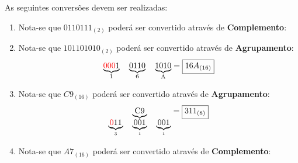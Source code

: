 \documentclass{article}
\begin{document}
            \begin{resolution}
                As seguintes conversões devem ser realizadas:
                \begin{enumerate}[rightmargin = \leftmargin]
                    \item Nota-se que $0110111_{(2)}$ poderá ser convertido através de \textbf{Complemento}:
                        \begin{figure}[H]
                            \centering
                        \end{figure}

                    \item Nota-se que $101101010_{(2)}$ poderá ser convertido através de \textbf{Agrupamento}:
                        \begin{equation*}
                            \underbrace{\text{\textcolor{red}{000}1}}_{
                                \text{1}
                            }
                            \quad
                            \underbrace{\text{0110}}_{
                                \text{6}
                            }
                            \quad
                            \underbrace{\text{1010}}_{
                                \text{A}
                            } = 
                            \boxed{16A_{(16)}}
                        \end{equation*}

                    \item Nota-se que $C9_{(16)}$ poderá ser convertido através de \textbf{Agrupamento}:
                        \begin{equation*}
                            \underbrace{\text{C9}}_{
                                \underbrace{\text{\textcolor{red}{0}11}}_{
                                    \text{3}
                                }
                                \quad
                                \underbrace{\text{001}}_{
                                    \text{1}
                                }
                                \quad
                                \underbrace{\text{001}}_{
                                    \text{1}
                                }
                            } = 
                            \boxed{311_{(8)}}
                        \end{equation*}

                    \item Nota-se que $A7_{(16)}$ poderá ser convertido através de \textbf{Complemento}:
                        \begin{figure}[H]
                            \centering
                        \end{figure}


\end{enumerate}
\end{resolution}
\end{document}
